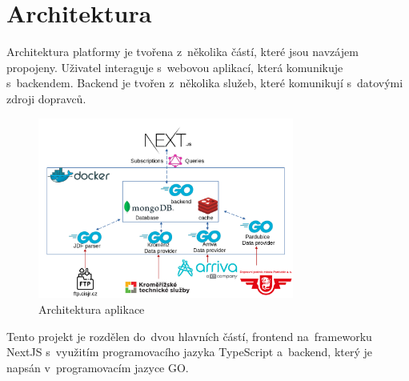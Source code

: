 \section{Architektura}
Architektura platformy je tvořena z~několika částí, které jsou navzájem propojeny. Uživatel interaguje s~webovou aplikací, která komunikuje s~backendem. Backend je tvořen z~několika služeb, které komunikují s~datovými zdroji dopravců.
\par
\begin{figure}[H]
    \centering
    \includegraphics[width=0.75\textwidth]{images/architekturaV5.png}
    \caption{Architektura aplikace}
    \label{architektura}
\end{figure}
\par
Tento projekt je rozdělen do~dvou hlavních částí, frontend na~frameworku NextJS s~využitím programovacího jazyka TypeScript a~backend, který je napsán v~programovacím jazyce GO.